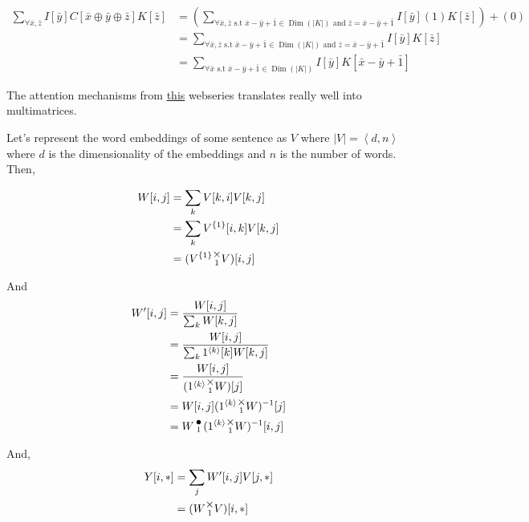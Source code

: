 \documentclass[12pt]{book}
\theoremstyle{plain}
\theoremstyle{definition}
\theoremstyle{ppart}
\theoremstyle{case}
\theoremstyle{solution}
\DeclareMathOperator{\Dim}{Dim}
\newcommand{\mmult}[1]{\text{\raisebox{1ex}{$\underset{#1}{\times}$}}}
\newcommand{\dmult}[1]{\text{\raisebox{1ex}{$\underset{#1}{\,\bullet\,}$}}}
\newcommand{\shape}[1]{\left|#1\right|}
\newcommand{\transpose}[2]{{#1}^{\{#2\}}}
\begin{document}
\begin{appendices}
\begin{landscape}
\begin{align*}
  \sum_{\forall \bar{x}, \bar{z}}
    I[\bar{y}]
    C[\bar{x} \oplus \bar{y} \oplus \bar{z}]
    K[\bar{z}]
  &=
  \left(
    \sum_{\forall \bar{x},\bar{z} \text{ s.t } \bar{x}-\bar{y}+\bar{1} \in \Dim(\shape{K}) \text{ and } \bar{z} = \bar{x}-\bar{y}+\bar{1}}
      I[\bar{y}]
      (1)
      K[\bar{z}]
  \right) + (0) \\
  &=
  \sum_{\forall \bar{x},\bar{z} \text{ s.t } \bar{x}-\bar{y}+\bar{1} \in \Dim(\shape{K}) \text{ and } \bar{z} = \bar{x}-\bar{y}+\bar{1}}
    I[\bar{y}]
    K[\bar{z}] \\
  &=
  \sum_{\forall \bar{x} \text{ s.t } \bar{x}-\bar{y}+\bar{1} \in \Dim(\shape{K})}
    I[\bar{y}]
    K[\bar{x}-\bar{y}+\bar{1}]
\end{align*}
\end{landscape}

The attention mechanisms from \href{https://www.youtube.com/watch?v=yGTUuEx3GkA}{this} webseries
translates really well into multimatrices.

Let's represent the word embeddings of some sentence as $V$ where $\shape{V} = \left<d, n\right>$ where $d$ is the dimensionality of
the embeddings and $n$ is the number of words. Then,

\begin{align*}
  W[i,j]
  &=
  \sum_k
  V[k, i]
  V[k, j] \\
  &=
  \sum_k
  \transpose{V}{1}[i, k]
  V[k, j] \\
  &= (\transpose{V}{1} \mmult{1} V)[i,j]
\end{align*}

And
\begin{align*}
  W'[i,j] &= \frac{
    W[i,j]
  }{
    \sum_k W[k,j]
  } \\
  &= 
  \frac{
    W[i,j]
  }{
   \sum_k 1^{\left<k\right>}[k] W[k,j]
  } \\
  &= 
  \frac{
    W[i,j]
  }{
    (1^{\left<k\right>} \mmult{1} W)[j]
  } \\
  &= 
  W[i,j]
  (1^{\left<k\right>} \mmult{1} W)^{-1}[j] \\
  &= 
  W \dmult{1} (1^{\left<k\right>} \mmult{1} W)^{-1} [i,j]
\end{align*}

And,
\begin{align*}
  Y[i,*]
  &=
  \sum_j W'[i,j] V[j,*] \\
  &=
  (W \mmult{1} V)[i,*]
\end{align*}


\end{appendices}
\end{document}
